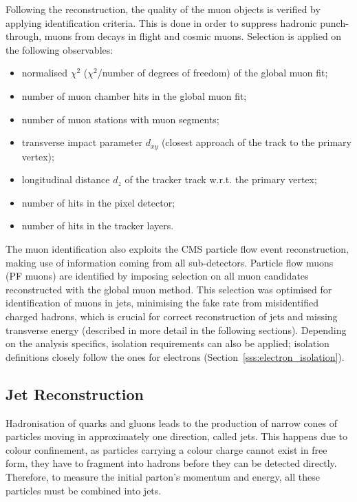 Following the reconstruction, the quality of the muon objects is verified by applying identification criteria. This is
done in order to suppress hadronic punch-through, muons from decays in flight and cosmic muons. Selection is applied on
the following observables:
\begin{itemize}
  \item normalised $\chi^2$ ($\chi^2$/number of degrees of freedom) of the global muon fit;
  \item number of muon chamber hits in the global muon fit;
  \item number of muon stations with muon segments;
  \item transverse impact parameter $d_{xy}$ (closest approach of the track to the primary vertex);
  \item longitudinal distance $d_z$ of the tracker track w.r.t. the primary vertex;
  \item number of hits in the pixel detector;
  \item number of hits in the tracker layers.
\end{itemize}

The muon identification also exploits the CMS particle flow event reconstruction, making use of information coming from
all sub-detectors. Particle flow muons (PF muons) are identified by imposing selection on all muon candidates
reconstructed with the global muon method. This selection was optimised for identification of muons in jets, minimising
the fake rate from misidentified charged hadrons, which is crucial for correct reconstruction of jets and missing
transverse energy (described in more detail in the following sections). Depending on the analysis specifics, isolation
requirements can also be applied; isolation definitions closely follow the ones for electrons
(Section~\ref{sss:electron_isolation}).


\subsection{Jet Reconstruction}
\label{ss:jet_reconstruction}
Hadronisation of quarks and gluons leads to the production of narrow cones of particles moving in approximately one
direction, called jets. This happens due to colour confinement, as particles carrying a colour charge cannot exist in
free form, they have to fragment into hadrons before they can be detected directly. Therefore, to measure the initial
parton's momentum and energy, all these particles must be combined into jets.

